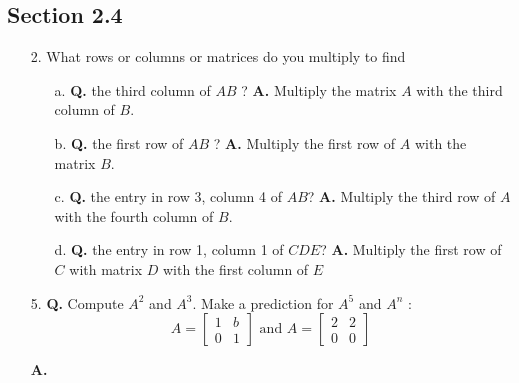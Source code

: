 \documentclass[main.tex]{subfiles}
\begin{document}
\subsection{Section 2.4}
\begin{enumerate}
    \item [2.] What rows or columns or matrices do you multiply to find
    \begin{enumerate}
        \item [a.] \textbf{Q.} the third column of $A B$ ? \textbf{A.} Multiply the matrix $A$ with the third column of $B$.
        
        \item [b.] \textbf{Q.} the first row of $A B$ ? \textbf{A.} Multiply the first row of $A$ with the matrix $B$.
        
        \item [c.] \textbf{Q.} the entry in row 3, column 4 of $A B$? \textbf{A.} Multiply the third row of $A$ with the fourth column of $B$.
        
        \item [d.] \textbf{Q.} the entry in row 1, column 1 of $C D E$? \textbf{A.} Multiply the first row of $C$ with matrix $D$ with the first column of $E$
        
    \end{enumerate}
    
    \item [5.] \textbf{Q.} Compute $A^{2}$ and $A^{3}$. Make a prediction for $A^{5}$ and $A^{n}$ :
    $$
    A=\left[\begin{array}{ll}
    1 & b \\
    0 & 1
    \end{array}\right] \text { and } A=\left[\begin{array}{ll}
    2 & 2 \\
    0 & 0
    \end{array}\right]
    $$
    
    \textbf{A.} 
    

\end{enumerate}
\end{document}
